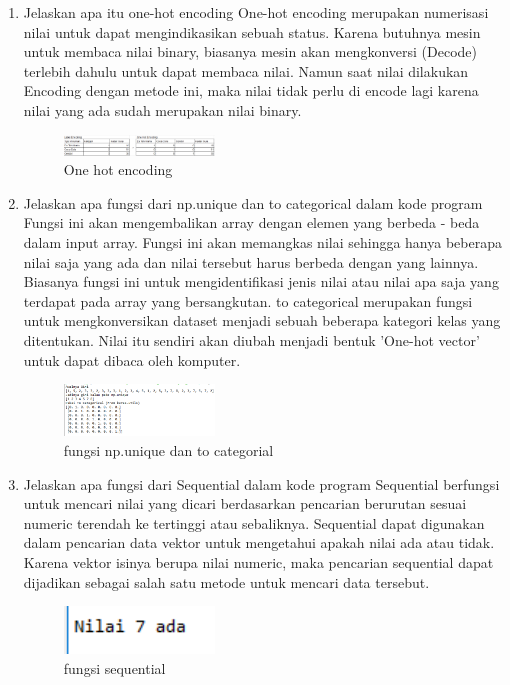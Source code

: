 \begin{enumerate}
	\item Jelaskan apa itu one-hot encoding
	\hfill\break
	One-hot encoding merupakan numerisasi nilai untuk dapat mengindikasikan sebuah status. Karena butuhnya mesin untuk membaca nilai binary, biasanya mesin akan mengkonversi (Decode) terlebih dahulu untuk dapat membaca nilai. Namun saat nilai dilakukan Encoding dengan metode ini, maka nilai tidak perlu di encode lagi karena nilai yang ada sudah merupakan nilai binary. 
	\begin{figure}[H]
	    \centering
	    \includegraphics[width=4cm]{figures/1174096/tugas6/teori_6.PNG}
	    \caption{One hot encoding}
    \end{figure}

    \item Jelaskan apa fungsi dari np.unique dan to categorical dalam kode program
    \hfill\break
    Fungsi ini akan mengembalikan array dengan elemen yang berbeda - beda dalam input array. Fungsi ini akan memangkas nilai sehingga hanya beberapa nilai saja yang ada dan nilai tersebut harus berbeda dengan yang lainnya. Biasanya fungsi ini untuk mengidentifikasi jenis nilai atau nilai apa saja yang terdapat pada array yang bersangkutan. to categorical merupakan fungsi untuk mengkonversikan dataset menjadi sebuah beberapa kategori kelas yang ditentukan. Nilai itu sendiri akan diubah menjadi bentuk 'One-hot vector' untuk dapat dibaca oleh komputer.
    
    \begin{figure}[H]
	    \centering
	    \includegraphics[width=4cm]{figures/1174096/tugas6/teori_7.PNG}
	    \caption{fungsi np.unique dan to categorial}
    \end{figure}

    \item Jelaskan apa fungsi dari Sequential dalam kode program
    \hfill\break
    Sequential berfungsi untuk mencari nilai yang dicari berdasarkan pencarian berurutan sesuai numeric terendah ke tertinggi atau sebaliknya. Sequential dapat digunakan dalam pencarian data vektor untuk mengetahui apakah nilai ada atau tidak. Karena vektor isinya berupa nilai numeric, maka pencarian sequential dapat dijadikan sebagai salah satu metode untuk mencari data tersebut.
    
    \begin{figure}[H]
	    \centering
	    \includegraphics[width=4cm]{figures/1174096/tugas6/teori_8.PNG}
	    \caption{fungsi sequential}
    \end{figure}
\end{enumerate}

